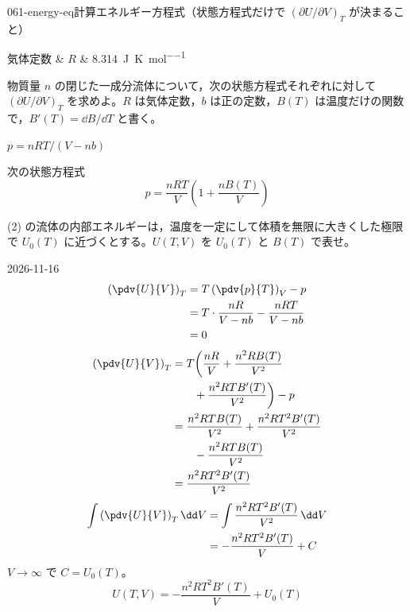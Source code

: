 \documentclass[uplatex,dvipdfmx,a4paper,11pt]{jsarticle}
\begin{document}
\begin{mondai}{061-energy-eq}{計算}{エネルギー方程式（状態方程式だけで $(\partial U/\partial V)_{T}$ が決まること）}
\begin{teisuu}
  気体定数 & $R$ & \qty{8.314}{\joule\per\kelvin\per\mole}\\
\end{teisuu}
物質量 $n$ の閉じた一成分流体について，次の状態方程式それぞれに対して $(\partial U/\partial V)_{T}$ を求めよ。$R$ は気体定数，$b$ は正の定数，$B(T)$ は温度だけの関数で，$B'(T) = \dd B/\dd T$ と書く。
  \begin{shoumon}
    \item $p = nRT/(V - nb)$
    \item 次の状態方程式
    \[ p = \frac{nRT}{V}\left(1 + \frac{nB(T)}{V}\right) \]
    \item (2) の流体の内部エネルギーは，温度を一定にして体積を無限に大きくした極限で $U_{0}(T)$ に近づくとする。$U(T,V)$ を $U_{0}(T)$ と $B(T)$ で表せ。
  \end{shoumon}
\begin{kotaeutsushi}{2026-11-16}
\begin{align*}
\left(\pdv{U}{V}\right)_{T}&=T\left(\pdv{p}{T}\right)_{V}-p\\
&=T\cdot\frac{nR}{V-nb}-\frac{nRT}{V-nb}\\
&=0
\end{align*}
\begin{align*}
\left(\pdv{U}{V}\right)_{T}&=T\biggl(\frac{nR}{V}+\frac{n^{2}RB(T)}{V^{2}}\\
&\qquad+\frac{n^{2}RTB'(T)}{V^{2}}\biggr)-p\\
&=\frac{n^{2}RTB(T)}{V^{2}}+\frac{n^{2}RT^{2}B'(T)}{V^{2}}\\
&\qquad-\frac{n^{2}RTB(T)}{V^{2}}\\
&=\frac{n^{2}RT^{2}B'(T)}{V^{2}}
\end{align*}
\begin{align*}
\int\left(\pdv{U}{V}\right)_{T}\dd V&=\int\frac{n^{2}RT^{2}B'(T)}{V^{2}}\,\dd V\\
&=-\frac{n^{2}RT^{2}B'(T)}{V}+C
\end{align*}
$V\to\infty$ で $C=U_{0}(T)$。
\[ U(T,V)=-\frac{n^{2}RT^{2}B'(T)}{V}+U_{0}(T) \]
\end{kotaeutsushi}
\end{mondai}
\end{document}
